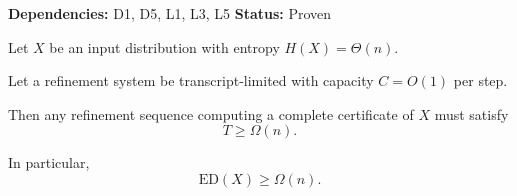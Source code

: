 \begin{theorem}
\textbf{Dependencies: } D1, D5, L1, L3, L5
\textbf{Status: } Proven

Let $X$ be an input distribution with entropy $H(X)=\Theta(n)$.

Let a refinement system be transcript-limited with capacity $C = O(1)$ per step.

Then any refinement sequence computing a complete certificate of $X$ must satisfy
\[
T \ge \Omega(n).
\]

In particular,
\[
\mathrm{ED}(X) \ge \Omega(n).
\]
\end{theorem}
